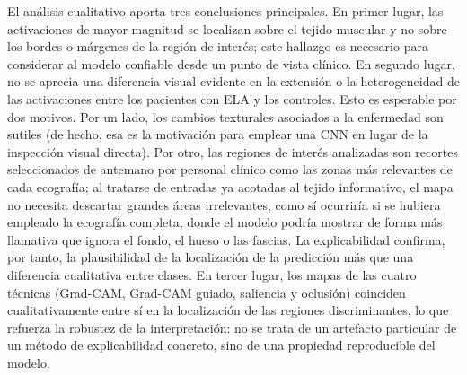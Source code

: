 \documentclass[12pt]{extarticle}
\numberwithin{equation}{section}
\begin{document}
\begin{refsection}
El análisis cualitativo aporta tres conclusiones principales. En primer lugar, las activaciones de mayor magnitud se localizan sobre el tejido muscular y no sobre los bordes o márgenes de la región de interés; este hallazgo es necesario para considerar al modelo confiable desde un punto de vista clínico. En segundo lugar, no se aprecia una diferencia visual evidente en la extensión o la heterogeneidad de las activaciones entre los pacientes con ELA y los controles. Esto es esperable por dos motivos. Por un lado, los cambios texturales asociados a la enfermedad son sutiles (de hecho, esa es la motivación para emplear una CNN en lugar de la inspección visual directa). Por otro, las regiones de interés analizadas son recortes seleccionados de antemano por personal clínico como las zonas más relevantes de cada ecografía; al tratarse de entradas ya acotadas al tejido informativo, el mapa no necesita descartar grandes áreas irrelevantes, como sí ocurriría si se hubiera empleado la ecografía completa, donde el modelo podría mostrar de forma más llamativa que ignora el fondo, el hueso o las fascias. La explicabilidad confirma, por tanto, la plausibilidad de la localización de la predicción más que una diferencia cualitativa entre clases. En tercer lugar, los mapas de las cuatro técnicas (Grad-CAM, Grad-CAM guiado, saliencia y oclusión) coinciden cualitativamente entre sí en la localización de las regiones discriminantes, lo que refuerza la robustez de la interpretación: no se trata de un artefacto particular de un método de explicabilidad concreto, sino de una propiedad reproducible del modelo.


\end{refsection}
\end{document}
